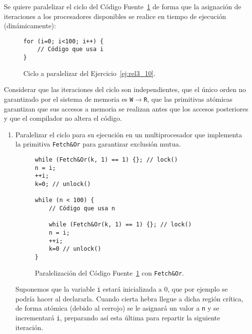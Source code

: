 \begin{ejercicio}\label{ej:rel3_10}
    Se quiere paralelizar el ciclo del Código Fuente~\ref{cod:ej_rel3_10} de forma que la asignación de iteraciones a los
    procesadores disponibles se realice en tiempo de ejecución (dinámicamente):
    \begin{figure}[H]
        \centering
        \begin{verbatim}
for (i=0; i<100; i++) {
    // Código que usa i
}
        \end{verbatim}
        \caption{Ciclo a paralelizar del Ejercicio~\ref{ej:rel3_10}.}
        \label{cod:ej_rel3_10}
    \end{figure}
    \begin{observacion}
        Considerar que las iteraciones del ciclo son independientes, que el único orden no garantizado por el
        sistema de memoria es \verb|W|$\to$\verb|R|, que las primitivas atómicas garantizan que sus accesos a memoria se realizan
        antes que los accesos posteriores y que el compilador no altera el código.
    \end{observacion}
    \begin{enumerate}
        \item Paralelizar el ciclo para su ejecución en un multiprocesador que implementa la primitiva \verb|Fetch&Or|
        para garantizar exclusión mutua.
        
        \begin{figure}[H]
            \centering
            \begin{verbatim}
while (Fetch&Or(k, 1) == 1) {}; // lock()
n = i;
++i;
k=0; // unlock()

while (n < 100) {
    // Código que usa n
    
    while (Fetch&Or(k, 1) == 1) {}; // lock()
    n = i;
    ++i;
    k=0 // unlock()
}
            \end{verbatim}
            \caption{Paralelización del Código Fuente~\ref{cod:ej_rel3_10} con \texttt{Fetch\&Or}.}
            \label{cod:ej_rel3_10_1}
        \end{figure}

        Suponemos que la variable \verb|i| estará inicializada a $0$, que por ejemplo se podría hacer al declararla.
        Cuando cierta hebra llegue a dicha región crítica, de forma atómica (debido al cerrojo)
        se le asignará un valor a \verb|n| y se incrementará \verb|i|, preparando así esta última para repartir la siguiente iteración.


\end{enumerate}
\end{ejercicio}

